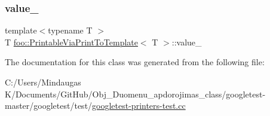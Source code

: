 \subsubsection{\texorpdfstring{value\_}{value\_}}
{\footnotesize\ttfamily template$<$typename T $>$ \\
T \mbox{\hyperlink{classfoo_1_1_printable_via_print_to_template}{foo\+::\+Printable\+Via\+Print\+To\+Template}}$<$ T $>$\+::value\+\_\+\hspace{0.3cm}{\ttfamily [private]}}



The documentation for this class was generated from the following file\+:\begin{DoxyCompactItemize}
\item 
C\+:/\+Users/\+Mindaugas K/\+Documents/\+Git\+Hub/\+Obj\+\_\+\+Duomenu\+\_\+apdorojimas\+\_\+class/googletest-\/master/googletest/test/\mbox{\hyperlink{googletest-master_2googletest_2test_2googletest-printers-test_8cc}{googletest-\/printers-\/test.\+cc}}\end{DoxyCompactItemize}
